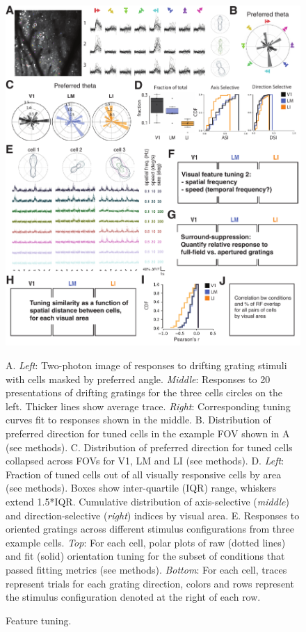 \documentclass{article}
\begin{document}
\begin{figure}[ht]
  \includegraphics[width=\textwidth]{figures/features.pdf}
  \caption{Feature tuning.}
  \medskip
  \small
  A.  \textit{Left}:  Two-photon image of responses to drifting grating stimuli with cells masked by preferred angle. \textit{Middle}:  Responses to 20 presentations of drifting gratings for the three cells circles on the left. Thicker lines show average trace. \textit{Right}:  Corresponding tuning curves fit to responses shown in the middle. 
  B.  Distribution of preferred direction for tuned cells in the example FOV shown in A (see methods).
  C.  Distribution of preferred direction for  tuned cells collapsed across FOVs for V1, LM and LI (see methods).
  D.  \textit{Left}: Fraction of tuned cells out of all visually responsive cells by area (see methods). Boxes show inter-quartile (IQR) range, whiskers extend 1.5*IQR. Cumulative distribution of axis-selective (\textit{middle}) and direction-selective (\textit{right}) indices by visual area. 
  E.  Responses to oriented gratings across different stimulus configurations from three example cells. \textit{Top}: For each cell, polar plots of raw (dotted lines) and fit (solid) orientation tuning for the subset of conditions that passed fitting metrics (see methods). \textit{Bottom}: For each cell, traces represent trials for each grating direction, colors and rows represent the stimulus configuration denoted at the right of each row.

\end{figure}
\end{document}
